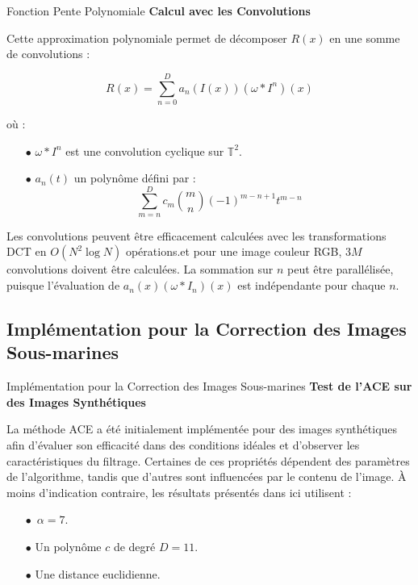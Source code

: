 \documentclass[8pt,a4paper]{beamer}
\numberwithin{figure}{section}
\begin{document}
\begin{frame}{Fonction Pente Polynomiale}
\textbf{Calcul avec les Convolutions}
\vspace{3mm}
\par Cette approximation polynomiale permet de décomposer \( R(x) \) en une somme de convolutions :

$$
R(x) = \sum_{n=0}^{D} a_n\left(I(x)\right) \left( \omega * I^n \right)(x)
$$

où :
\begin{itemize}
\item[$\bullet$] \( \omega * I^n \) est une convolution cyclique sur \( \mathbb{T}^2 \).
\item[$\bullet$]  \( a_n\left(t\right) \) un polynôme défini par :
$$
\sum_{m=n}^{D} c_m \binom{m}{n} (-1)^{m-n+1} t^{m-n}
$$
\end{itemize}

 Les convolutions peuvent être efficacement calculées avec les transformations DCT en \( O(N^2 \log N) \) opérations.et pour une image couleur RGB, \( 3M \) convolutions doivent être calculées. La sommation sur \( n \) peut être parallélisée, puisque l'évaluation de \( a_n(x) \left( \omega * I_n \right)(x) \) est indépendante pour chaque \( n \).
\end{frame}


\subsection{Implémentation pour la Correction des Images Sous-marines}
\begin{frame}{Implémentation pour la Correction des Images Sous-marines}
\textbf{Test de l'ACE sur des Images Synthétiques}
\vspace{3mm}
\par La méthode ACE a été initialement implémentée pour des images synthétiques afin d'évaluer son efficacité dans des conditions idéales et d'observer les caractéristiques du filtrage. Certaines de ces propriétés dépendent des paramètres de l'algorithme, tandis que d'autres sont influencées par le contenu de l'image. À moins d'indication contraire, les résultats présentés dans ici utilisent :
\vspace{3mm}
\begin{itemize}
	\item[$\bullet$] $\,\alpha = 7$.
    \item[$\bullet$]  Un polynôme $c$ de degré $D = 11$. 
    \item[$\bullet$]  Une distance euclidienne.
\end{itemize}
\end{frame}
\end{document}
